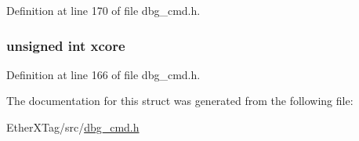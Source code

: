 Definition at line 170 of file dbg\-\_\-cmd.\-h.

\hypertarget{structdbg__cmd__type__add__break_a78357326dd562d441c3c73f5676ac638}{
\subsubsection[{xcore}]{\setlength{\rightskip}{0pt plus 5cm}unsigned int xcore}}\label{structdbg__cmd__type__add__break_a78357326dd562d441c3c73f5676ac638}


Definition at line 166 of file dbg\-\_\-cmd.\-h.



The documentation for this struct was generated from the following file\-:\begin{DoxyCompactItemize}
\item 
Ether\-X\-Tag/src/\hyperlink{dbg__cmd_8h}{dbg\-\_\-cmd.\-h}\end{DoxyCompactItemize}
